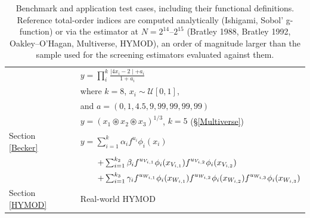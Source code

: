 \documentclass[12pt]{article}
\begin{document}
\begin{table}[H]
{\begin{tabular}{@{}lll@{}}
                        & \cite{sobol1998quasi}                  & $y=\prod\limits_i^k\frac{\mid4x_i-2\mid+a_i}{1+a_i}$                                                                                                    \\
                        &                                        & where $k=8$, $x_i\sim\mathscr{U}[0,1]$,                                                                                                                 \\
                        &                                        & and $a=(0,1,4.5,9,99,99,99,99)$                                                                                                                         \\
                        & \cite{saltelli2025}                    & $y = (x_1 \circledast x_2 \circledast x_3)^{1/3}$, $k=5$ (\S\ref{Multiverse})                                                                          \\
Section \ref{Becker}    & \cite{becker_metafunctions_2020}       & $y = \sum_{i=1}^{k}\alpha_i f^{u_i}\phi_i(x_i)$                                                                                                         \\
                        &                                        & $\hspace{0.7cm}+ \sum_{i=1}^{k_2}\beta_i f^{u_{V_{i,1}}} \phi_i(x_{V_{i,1}}) f^{u_{V_{i,2}}} \phi_i(x_{V_{i,2}})$                                       \\
                        &                                        & $\hspace{0.7cm}+ \sum_{i=1}^{k_3}\gamma_i f^{u_{W_{i,1}}} \phi_i(x_{W_{i,1}}) f^{u_{W_{i,2}}} \phi_i(x_{W_{i,2}}) f^{u_{W_{i,3}}} \phi_i(x_{W_{i,3}})$  \\
Section \ref{HYMOD}     & \cite{vrugt2003shuffled}               & Real-world HYMOD                                                                                                                                        \\ \bottomrule
\end{tabular}
}
\caption{Benchmark and application test cases, including their functional definitions. Reference total-order indices are computed analytically (Ishigami, Sobol' g-function) or via the \citet{jansen1999} estimator at $N=2^{14}$--$2^{15}$ (Bratley 1988, Bratley 1992, Oakley--O'Hagan, Multiverse, HYMOD), an order of magnitude larger than the sample used for the screening estimators evaluated against them.}
\label{tab:datasets}
\end{table}
\end{document}

